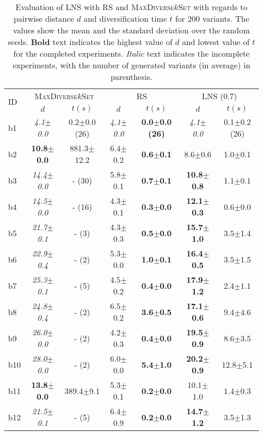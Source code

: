 \begin{longtable}{|l|c|c|c|c|c|c|}
\caption{\label{tab:dist_max_rs_lns} Evaluation of \ac{LNS} with \ac{RS} and \textsc{MaxDiverse$k$Set}
		with regards to pairwise distance $d$ and diversification time $t$ for 200 variants. The values
		show the mean and the standard deviation over the random seeds.
		\textbf{Bold} text indicates the highest value of $d$ and lowest value of $t$
		for the completed experiments. 
		\textit{Italic} text indicates the incomplete experiments, 
		with the number of generated variants (in average) in parenthesis.}\\
\hline
\multirow{2}{*}{ID}&\multicolumn{2}{c|}{\textsc{MaxDiverse$k$Set}}&\multicolumn{2}{c|}{{RS}}&\multicolumn{2}{c|}{LNS (0.7)}\\
\cline{2-7}
&$d$&$t(s)$&$d$&$t(s)$&$d$&$t(s)$\\
\hline
b1&\textit{4.1$\pm$0.0} & 0.2$\pm$0.0 (26)&\textit{4.1$\pm$0.0} & \textbf{0.0$\pm$0.0 (26)}&\textit{4.1$\pm$0.0} & 0.1$\pm$0.2 (26)
\\
b2&\textbf{10.8$\pm$0.0} & 881.3$\pm$12.2&6.4$\pm$0.2 & \textbf{0.6$\pm$0.1}&8.6$\pm$0.6 & 1.0$\pm$0.1
\\
b3&\textit{14.4$\pm$0.0} & - (30)&5.8$\pm$0.1 & \textbf{0.7$\pm$0.1}&\textbf{10.8$\pm$0.8} & 1.1$\pm$0.1
\\
b4&\textit{14.5$\pm$0.0} & - (16)&4.3$\pm$0.1 & \textbf{0.3$\pm$0.0}&\textbf{12.1$\pm$0.3} & 0.6$\pm$0.0
\\
b5&\textit{21.7$\pm$0.1} & - (3)&4.3$\pm$0.3 & \textbf{0.5$\pm$0.0}&\textbf{15.7$\pm$1.0} & 3.5$\pm$1.4
\\
b6&\textit{22.9$\pm$0.4} & - (2)&5.3$\pm$0.0 & \textbf{1.0$\pm$0.1}&\textbf{16.4$\pm$0.5} & 3.5$\pm$1.5
\\
b7&\textit{25.3$\pm$0.1} & - (5)&4.5$\pm$0.2 & \textbf{0.4$\pm$0.0}&\textbf{17.9$\pm$1.2} & 2.4$\pm$1.1
\\
b8&\textit{24.8$\pm$0.4} & - (2)&6.5$\pm$0.2 & \textbf{3.6$\pm$0.5}&\textbf{17.1$\pm$0.6} & 9.4$\pm$4.6
\\
b9&\textit{26.0$\pm$0.0} & - (2)&4.2$\pm$0.3 & \textbf{0.4$\pm$0.0}&\textbf{19.5$\pm$0.9} & 8.6$\pm$3.5
\\
b10&\textit{28.0$\pm$0.0} & - (2)&6.0$\pm$0.0 & \textbf{5.4$\pm$1.0}&\textbf{20.2$\pm$0.9} & 12.8$\pm$5.1
\\
b11&\textbf{13.8$\pm$0.0} & 389.4$\pm$9.1&5.3$\pm$0.1 & \textbf{0.2$\pm$0.0}&10.1$\pm$1.0 & 1.4$\pm$0.3
\\
b12&\textit{21.5$\pm$0.1} & - (5)&6.4$\pm$0.9 & \textbf{0.2$\pm$0.0}&\textbf{14.7$\pm$1.2} & 3.5$\pm$1.3

\end{longtable}
